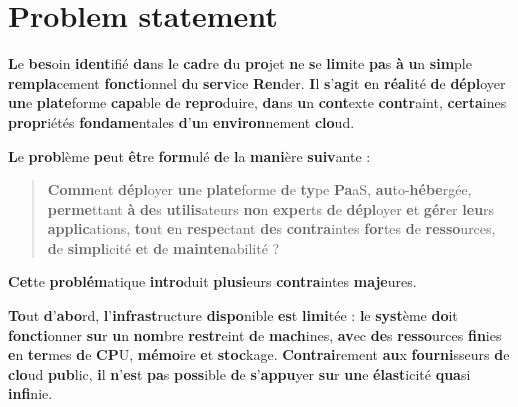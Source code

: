 \documentclass{rapportClass} %
\begin{document}
\section{Problem statement}

\textbf{L}e \textbf{bes}oin \textbf{ident}ifié \textbf{da}ns \textbf{l}e \textbf{cad}re \textbf{d}u \textbf{pro}jet \textbf{n}e \textbf{s}e \textbf{lim}ite \textbf{pa}s \textbf{à} \textbf{u}n
\textbf{sim}ple \textbf{rempla}cement \textbf{foncti}onnel \textbf{d}u \textbf{serv}ice \textbf{Ren}der. \textbf{I}l \textbf{s}’\textbf{ag}it \textbf{e}n \textbf{réal}ité
\textbf{d}e \textbf{dépl}oyer \textbf{un}e \textbf{plate}forme \textbf{capa}ble \textbf{d}e \textbf{repro}duire, \textbf{da}ns \textbf{u}n \textbf{cont}exte
\textbf{contr}aint, \textbf{certa}ines \textbf{propr}iétés \textbf{fondame}ntales \textbf{d}’\textbf{u}n \textbf{environ}nement \textbf{clo}ud.

\textbf{L}e \textbf{prob}lème \textbf{pe}ut \textbf{êt}re \textbf{form}ulé \textbf{d}e \textbf{l}a \textbf{mani}ère \textbf{suiv}ante :

\begin{quote}
\textbf{Comm}ent \textbf{dépl}oyer \textbf{un}e \textbf{plate}forme \textbf{d}e \textbf{ty}pe \textbf{Pa}aS,
\textbf{au}to-\textbf{hébe}rgée, \textbf{perme}ttant \textbf{à} \textbf{de}s \textbf{utilis}ateurs \textbf{no}n \textbf{expe}rts \textbf{d}e \textbf{dépl}oyer
\textbf{e}t \textbf{gér}er \textbf{leu}rs \textbf{applic}ations, \textbf{to}ut \textbf{e}n \textbf{respe}ctant \textbf{de}s \textbf{contra}intes \textbf{for}tes
\textbf{d}e \textbf{resso}urces, \textbf{d}e \textbf{simpl}icité \textbf{e}t \textbf{d}e \textbf{mainten}abilité ?
\end{quote}

\textbf{Cet}te \textbf{problém}atique \textbf{intro}duit \textbf{plusi}eurs \textbf{contra}intes \textbf{maje}ures.

\textbf{To}ut \textbf{d}’\textbf{abo}rd, \textbf{l}’\textbf{infrast}ructure \textbf{dispo}nible \textbf{es}t \textbf{limi}tée : \textbf{l}e \textbf{syst}ème \textbf{do}it
\textbf{foncti}onner \textbf{su}r \textbf{u}n \textbf{nom}bre \textbf{restr}eint \textbf{d}e \textbf{mach}ines, \textbf{av}ec \textbf{de}s \textbf{resso}urces
\textbf{fin}ies \textbf{e}n \textbf{ter}mes \textbf{d}e \textbf{CP}U, \textbf{mémo}ire \textbf{e}t \textbf{stoc}kage. \textbf{Contrai}rement \textbf{au}x
\textbf{fourni}sseurs \textbf{d}e \textbf{clo}ud \textbf{pub}lic, \textbf{i}l \textbf{n}’\textbf{es}t \textbf{pa}s \textbf{poss}ible \textbf{d}e \textbf{s}’\textbf{appu}yer \textbf{su}r
\textbf{un}e \textbf{élast}icité \textbf{qua}si \textbf{infi}nie.
\end{document}
